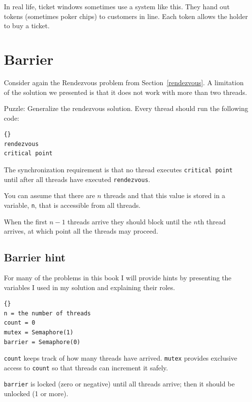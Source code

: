 \documentclass{book}
\newcommand{\clearemptydoublepage}{\newpage\cleardoublepage}
\begin{document}
In real life, ticket windows sometimes use a system like
this.  They hand out tokens (sometimes poker chips) to
customers in line.  Each token allows the holder to buy a ticket.




\section{Barrier}

Consider again the Rendezvous problem from Section~\ref{rendezvous}.
A limitation of the solution we presented is that it does
not work with more than two threads.

Puzzle: Generalize the rendezvous solution.  Every thread should
run the following code:

\begin{lstlisting}[caption={Barrier code}]{}
rendezvous
critical point
\end{lstlisting}

The synchronization requirement is that
no thread executes {\tt critical point} until after all
threads have executed {\tt rendezvous}.

You can assume that there are $n$
threads and that this value is stored in a variable, {\tt n},
that is accessible from all threads.

When the first $n-1$ threads arrive they should block until the $n$th
thread arrives, at which point all the threads may proceed.


\clearemptydoublepage
\subsection {Barrier hint}

For many of the problems in this book I will provide hints
by presenting the variables I used in my solution and
explaining their roles.

\begin{lstlisting}[caption={Barrier hint}]{}
n = the number of threads
count = 0
mutex = Semaphore(1)
barrier = Semaphore(0)
\end{lstlisting}

{\tt count} keeps track of how many threads have arrived.
{\tt mutex} provides exclusive access to {\tt count} so that
threads can increment it safely.

{\tt barrier} is locked
(zero or negative) until all threads arrive; then it should
be unlocked (1 or more).


\clearemptydoublepage
\end{document}
